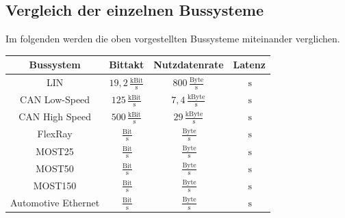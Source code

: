 \subsection{Vergleich der einzelnen Bussysteme}
Im folgenden werden die oben vorgestellten Bussysteme miteinander verglichen.
\begin{table}[hbt]	
	\centering
	\renewcommand{\arraystretch}{1.5}	%
	\label{tab:Speicherbedarf}
	\begin{tabular}{c|ccc}
		 \parbox[t]{0.2\linewidth}{\centering Bussystem} & \parbox[t]{0.2\linewidth}{\centering Bittakt} & \parbox[t]{0.2\linewidth}{\centering Nutzdatenrate} & \parbox[t]{0.2\linewidth}{\centering Latenz} \\ 
		\hline 
		\hline
		LIN & $ 19,2\,\frac{\mathrm{kBit}}{\mathrm{s}} $ & $ 800\,\frac{\mathrm{Byte}}{\mathrm{s}} $ & $ \,\mathrm{s} $ \\
		CAN Low-Speed & $ 125\,\frac{\mathrm{kBit}}{\mathrm{s}} $ & $ 7,4\,\frac{\mathrm{kByte}}{\mathrm{s}} $ & $ \,\mathrm{s} $ \\
		CAN High Speed & $ 500\,\frac{\mathrm{kBit}}{\mathrm{s}} $ & $ 29\,\frac{\mathrm{kByte}}{\mathrm{s}} $ & $ \,\mathrm{s} $ \\
		FlexRay & $ \,\frac{\mathrm{Bit}}{\mathrm{s}} $ & $ \,\frac{\mathrm{Byte}}{\mathrm{s}} $ & $ \,\mathrm{s} $ \\
		MOST25 & $ \,\frac{\mathrm{Bit}}{\mathrm{s}} $ & $ \,\frac{\mathrm{Byte}}{\mathrm{s}} $ & $ \,\mathrm{s} $ \\
		MOST50 & $ \,\frac{\mathrm{Bit}}{\mathrm{s}} $ & $ \,\frac{\mathrm{Byte}}{\mathrm{s}} $ & $ \,\mathrm{s} $ \\
		MOST150 & $ \,\frac{\mathrm{Bit}}{\mathrm{s}} $ & $ \,\frac{\mathrm{Byte}}{\mathrm{s}} $ & $ \,\mathrm{s} $ \\
		Automotive Ethernet & $ \,\frac{\mathrm{Bit}}{\mathrm{s}} $ & $ \,\frac{\mathrm{Byte}}{\mathrm{s}} $ & $ \,\mathrm{s} $ \\
	\end{tabular} 
\end{table}
